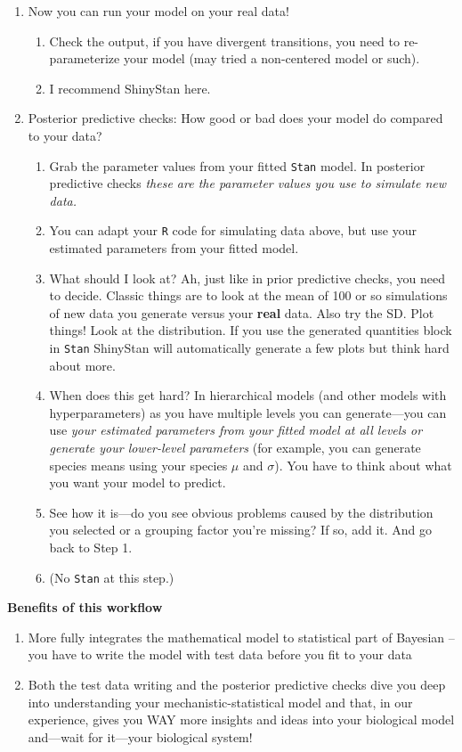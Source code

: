 \documentclass[11pt]{article}
\begin{document}
\begin{enumerate}
\item Now you can run your model on your real data!
\begin{enumerate}
\item Check the output, if you have divergent transitions, you need to re-parameterize your model (may tried a non-centered model or such).
\item I recommend ShinyStan here.
\end{enumerate}
\item Posterior predictive checks: How good or bad does your model do compared to your data?
\begin{enumerate}
\item Grab the parameter values from your fitted \verb|Stan| model. In posterior predictive checks \emph{these are the parameter values you use to simulate new data.}  
\item You can adapt your \verb|R| code for simulating data above, but use your estimated parameters from your fitted model. 
\item What should I look at? Ah, just like in prior predictive checks, you need to decide. Classic things are to look at the mean of 100 or so simulations of new data you generate versus your {\bf real} data. Also try the SD. Plot things! Look at the distribution. If you use the generated quantities block in \verb|Stan| ShinyStan will automatically generate a few plots but think hard about more.
\item When does this get hard? In hierarchical models (and other models with hyperparameters) as you have multiple levels you can generate---you can use \emph{your estimated parameters from your fitted model at all levels or generate your lower-level parameters} (for example, you can generate species means using your species $\mu$ and $\sigma$). You have to think about what you want your model to predict.
\item See how it is---do you see obvious problems caused by the distribution you selected or a grouping factor you're missing? If so, add it. And go back to Step 1. 
\item (No \verb|Stan| at this step.)
\end{enumerate}
\end{enumerate}

{\bf Benefits of this workflow}

\begin{enumerate}
\item More fully integrates the mathematical model to statistical part of Bayesian -- you have to write the model with test data before you fit to your data
\item Both the test data writing and the posterior predictive checks dive you deep into understanding your mechanistic-statistical model and that, in our experience, gives you WAY more insights and ideas into your biological model and---wait for it---your biological system!
\end{enumerate}
\end{document}
